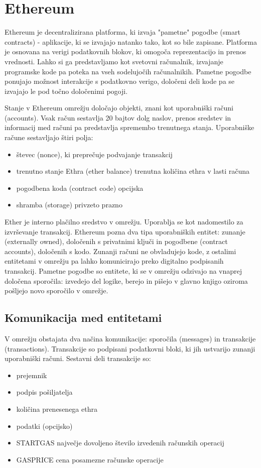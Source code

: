 \documentclass[a4paper, 12pt]{book}
\begin{document}
\section{Ethereum}
Ethereum je decentralizirana platforma, ki izvaja "pametne" pogodbe (smart contracts) - aplikacije, ki se izvajajo natanko tako, kot so bile zapisane.
Platforma je osnovana na verigi podatkovnih blokov, ki omogoča reprezentacijo in prenos vrednosti.
Lahko si ga predstavljamo kot svetovni računalnik, izvajanje programske kode pa poteka na vseh sodelujočih računalnikih.
Pametne pogodbe ponujajo možnost interakcije s podatkovno verigo, določeni deli kode pa se izvajajo le pod točno določenimi pogoji.

Stanje v Ethereum omrežju določajo objekti, znani kot uporabniški računi (accounts).
Vsak račun sestavlja 20 bajtov dolg naslov, prenos sredstev in informacij med računi pa predstavlja spremembo trenutnega stanja.
Uporabniške račune sestavljajo štiri polja:
\begin{itemize}
\item števec (nonce), ki preprečuje podvajanje transakcij
\item trenutno stanje Ethra (ether balance) trenutna količina ethra v lasti računa
\item pogodbena koda (contract code) opcijska
\item shramba (storage) privzeto prazno
\end{itemize}

Ether je interno plačilno sredstvo v omrežju.
Uporablja se kot nadomestilo za izvrševanje transakcij.
Ethereum pozna dva tipa uporabniških entitet: zunanje (externally owned), določenih s privatnimi ključi in pogodbene (contract accounts), določenih s kodo.
Zunanji računi ne obvladujejo kode, z ostalimi entitetami v omrežju pa lahko komunicirajo preko digitalno podpisanih transakcij.
Pametne pogodbe so entitete, ki se v omrežju odzivajo na vnaprej določena sporočila: izvedejo del logike, berejo in pišejo v glavno knjigo oziroma pošljejo novo sporočilo v omrežje.

\subsection{Komunikacija med entitetami}
V omrežju obstajata dva načina komunikacije: sporočila (messages) in transakcije (transactions).
Transakcije so podpisani podatkovni bloki, ki jih ustvarijo zunanji uporabniški računi.
Sestavni deli transakcije so:
\begin{itemize}
	\item prejemnik
	\item podpis pošiljatelja
	\item količina prenesenega ethra
	\item podatki (opcijsko)
	\item STARTGAS največje dovoljeno število izvedenih računskih operacij
	\item GASPRICE cena posamezne računske operacije
\end{itemize}
\end{document}
